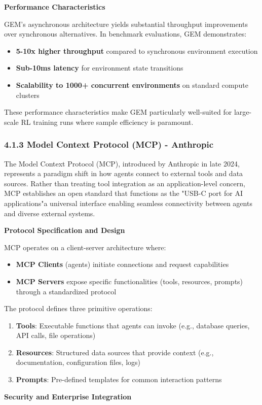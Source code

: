 \textbf{Performance Characteristics}

GEM's asynchronous architecture yields substantial throughput improvements over synchronous alternatives. In benchmark evaluations, GEM demonstrates:

\begin{itemize}
    \item \textbf{5-10x higher throughput} compared to synchronous environment execution
    \item \textbf{Sub-10ms latency} for environment state transitions
    \item \textbf{Scalability to 1000+ concurrent environments} on standard compute clusters

\end{itemize}
These performance characteristics make GEM particularly well-suited for large-scale RL training runs where sample efficiency is paramount.

\subsubsection{4.1.3 Model Context Protocol (MCP) - Anthropic}

The Model Context Protocol (MCP), introduced by Anthropic in late 2024, represents a paradigm shift in how agents connect to external tools and data sources. Rather than treating tool integration as an application-level concern, MCP establishes an open standard that functions as the "USB-C port for AI applications"a universal interface enabling seamless connectivity between agents and diverse external systems.

\textbf{Protocol Specification and Design}

MCP operates on a client-server architecture where:
\begin{itemize}
    \item \textbf{MCP Clients} (agents) initiate connections and request capabilities
    \item \textbf{MCP Servers} expose specific functionalities (tools, resources, prompts) through a standardized protocol

\end{itemize}
The protocol defines three primitive operations:

\begin{enumerate}
    \item \textbf{Tools}: Executable functions that agents can invoke (e.g., database queries, API calls, file operations)
    \item \textbf{Resources}: Structured data sources that provide context (e.g., documentation, configuration files, logs)
    \item \textbf{Prompts}: Pre-defined templates for common interaction patterns

\end{enumerate}
\textbf{Security and Enterprise Integration}

